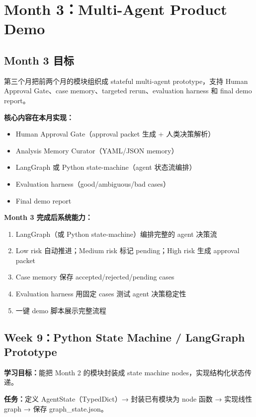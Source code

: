 \documentclass[11pt,a4paper,fontset=fandol]{ctexart}
\begin{document}
\newpage

\section{Month 3：Multi-Agent Product Demo}

\subsection{Month 3 目标}

第三个月把前两个月的模块组织成 stateful multi-agent prototype，支持 Human Approval Gate、case memory、targeted rerun、evaluation harness 和 final demo report。

\textbf{核心内容在本月实现：}
\begin{itemize}
  \item Human Approval Gate（approval packet 生成 + 人类决策解析）
  \item Analysis Memory Curator（YAML/JSON memory）
  \item LangGraph 或 Python state-machine（agent 状态流编排）
  \item Evaluation harness（good/ambiguous/bad cases）
  \item Final demo report
\end{itemize}

\textbf{Month 3 完成后系统能力：}
\begin{enumerate}
  \item LangGraph（或 Python state-machine）编排完整的 agent 决策流
  \item Low risk 自动推进；Medium risk 标记 pending；High risk 生成 approval packet
  \item Case memory 保存 accepted/rejected/pending cases
  \item Evaluation harness 用固定 cases 测试 agent 决策稳定性
  \item 一键 demo 脚本展示完整流程
\end{enumerate}

\subsection{Week 9：Python State Machine / LangGraph Prototype}

\textbf{学习目标：}能把 Month 2 的模块封装成 state machine nodes，实现结构化状态传递。

\textbf{任务：}定义 AgentState（TypedDict）→ 封装已有模块为 node 函数 → 实现线性 graph → 保存 graph\_state.json。
\end{document}
